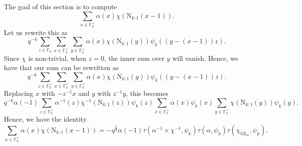 \documentclass[12pt, reqno]{amsart}
\theoremstyle{definition}
\theoremstyle{definition}
\theoremstyle{definition}
\newcommand{\multiplicativegroup}[1]{#1^{\times}}
\newcommand{\fieldCharacter}{\psi}
\newcommand{\GL}{\mathrm{GL}}
\newcommand{\FieldNorm}[2]{\mathrm{N}_{#1:#2}}
\newcommand{\finiteField}{\mathbb{F}}
\newcommand{\finiteFieldExtension}[1]{\finiteField_{#1}}
\newcommand{\GaussSumCharacter}[3]{\tau\left(#1 \times #2, #3\right)}
\begin{document}
The goal of this section is to compute $$\sum_{x \in \multiplicativegroup{\finiteFieldExtension{k}}} \alpha\left(x\right) \chi\left(\FieldNorm{k}{1}\left(x-1\right)\right).$$
Let us rewrite this as
$$q^{-k} \sum_{z \in \finiteFieldExtension{k}} \sum_{x \in  \multiplicativegroup{\finiteFieldExtension{k}}} \sum_{y \in \multiplicativegroup{\finiteFieldExtension{k}}}\alpha\left(x\right) \chi\left(\FieldNorm{k}{1}\left(y\right)\right) \fieldCharacter_k\left(\left(y - \left(x - 1\right)\right)z\right).$$
Since $\chi$ is non-trivial, when $z = 0$, the inner sum over $y$ will vanish. Hence, we have that our sum can be rewritten as
$$q^{-k} \sum_{z \in \multiplicativegroup{\finiteFieldExtension{k}}} \sum_{x \in  \multiplicativegroup{\finiteFieldExtension{k}}} \sum_{y \in \multiplicativegroup{\finiteFieldExtension{k}}}\alpha\left(x\right) \chi\left(\FieldNorm{k}{1}\left(y\right)\right) \fieldCharacter_k\left(\left(y - \left(x - 1\right)\right)z\right).$$
Replacing $x$ with $-z^{-1} x$ and $y$ with $z^{-1} y$, this becomes
$$q^{-k} \alpha\left(-1\right) \sum_{z \in \multiplicativegroup{\finiteFieldExtension{k}}} \alpha^{-1}\left(z\right) \chi^{-1}\left(\FieldNorm{k}{1}\left(z\right)\right) \fieldCharacter_k\left(z\right) \sum_{x \in  \multiplicativegroup{\finiteFieldExtension{k}}} \alpha\left(x\right) \fieldCharacter_k\left(x\right) \sum_{y \in \multiplicativegroup{\finiteFieldExtension{k}}} \chi\left(\FieldNorm{k}{1}\left(y\right)\right) \fieldCharacter_k\left(y\right).$$
Hence, we have the identity
$$\sum_{x \in \multiplicativegroup{\finiteFieldExtension{k}}} \alpha\left(x\right) \chi\left(\FieldNorm{k}{1}\left(x-1\right)\right) = -q^{\frac{k}{2}} \alpha\left(-1\right) \GaussSumCharacter{\alpha^{-1}}{\chi^{-1}}{\fieldCharacter_k} \tau\left(\alpha, \fieldCharacter_k\right) \tau\left(\chi_{\GL_k}, \fieldCharacter_k\right).$$
\end{document}
